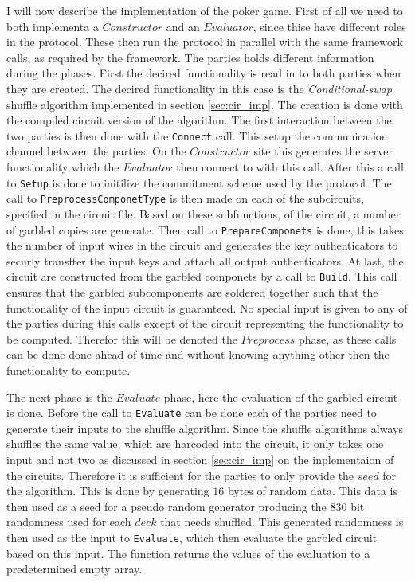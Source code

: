 \documentclass[twoside,11pt,openright]{report}
\newcommand{\CS}{\textit{Conditional-swap} }
\begin{document}
I will now describe the implementation of the poker game. First of all we need to both implementa a $Constructor$ and an $Evaluator$, since thise have different roles in the protocol. These then run the protocol in parallel with the same framework calls, as required by the framework. The parties holds different information during the phases. First the decired functionality is read in to both parties when they are created. The decired functionality in this case is the \CS shuffle algorithm implemented in section \ref{sec:cir_imp}. The creation is done with the compiled circuit version of the algorithm. The first interaction between the two parties is then done with the \verb|Connect| call. This setup the communication channel betwwen the parties. On the $Constructor$ site this generates the server functionality which the $Evaluator$ then connect to with this call. After this a call to \verb|Setup| is done to initilize the commitment scheme used by the protocol. The call to \verb|PreprocessComponetType| is then made on each of the subcircuits, specified in the circuit file. Based on these subfunctions, of the circuit, a number of garbled copies are generate. Then call to \verb|PrepareComponets| is done, this takes the number of input wires in the circuit and generates the key authenticators to securly transfter the input keys and attach all output authenticators. At last, the circuit are constructed from the garbled componets by a call to \verb|Build|. This call ensures that the garbled subcomponents are soldered together such that the functionality of the input circuit is guaranteed. No special input is given to any of the parties during this calls except of the circuit representing the functionality to be computed. Therefor this will be denoted the $Preprocess$ phase, as these calls can be done done ahead of time and without knowing anything other then the functionality to compute.

The next phase is the $Evaluate$ phase, here the evaluation of the garbled circuit is done. Before the call to \verb|Evaluate| can be done each of the parties need to generate their inputs to the shuffle algorithm. Since the shuffle algorithms always shuffles the same value, which are harcoded into the circuit, it only takes one input and not two as discussed in section \ref{sec:cir_imp} on the inplementaion of the circuits. Therefore it is sufficient for the parties to only provide the $seed$ for the algorithm. This is done by generating $16$ bytes of random data. This data is then used as a seed for a pseudo random generator producing the $830$ bit randomness used for each $deck$ that needs shuffled. This generated randomness is then used as the input to \verb|Evaluate|, which then evaluate the garbled circuit based on this input. The function returns the values of the evaluation to a predetermined empty array.
\end{document}
